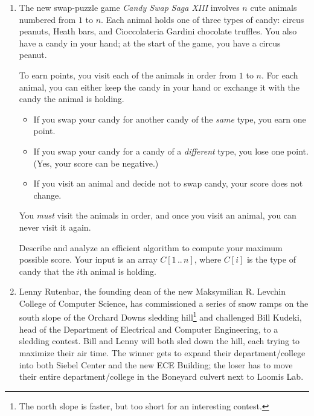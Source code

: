 \begin{enumerate}[label=\arabic*.,ref=\thechapter.\arabic*,leftmargin=*,align=left,widest*=99,itemsep=1.5ex plus 0.5ex]
Describe and analyze an efficient algorithm to compute the maximum total score you can achieve.
The input to your sweet algorithm is the pair of arrays $\Var{Score}[1\,..\,n]$ and $\Var{Wait}[1\,..\,n]$.

\item The new swap-puzzle game \textit{Candy Swap Saga XIII} involves $n$ cute animals numbered from $1$ to $n$.
Each animal holds one of three types of candy: circus peanuts, Heath bars, and Cioccolateria Gardini chocolate truffles.
You also have a candy in your hand; at the start of the game, you have a circus peanut.

To earn points, you visit each of the animals in order from $1$ to $n$.
For each animal, you can either keep the candy in your hand or exchange it with the candy the animal is holding.
\begin{itemize}
\item If you swap your candy for another candy of the \textit{same} type, you earn one point.
\item If you swap your candy for a candy of a \textit{different} type, you lose one point.
(Yes, your score can be negative.)
\item If you visit an animal and decide not to swap candy, your score does not change.
\end{itemize}
You \textit{must} visit the animals in order, and once you visit an animal, you can never visit it again.

Describe and analyze an efficient algorithm to compute your maximum possible score.
Your input is an array $C[1\,..\,n]$, where $C[i]$ is the type of candy that the $i$th animal is holding.

\item Lenny Rutenbar, the founding dean of the new Maksymilian R. Levchin College of Computer Science, has commissioned a series of snow ramps on the south slope of the Orchard Downs sledding hill\footnote{The north slope is faster, but too short for an interesting contest.} and challenged Bill Kudeki, head of the Department of Electrical and Computer Engineering, to a sledding contest.
Bill and Lenny will both sled down the hill, each trying to maximize their air time.
The winner gets to expand their department/college into both Siebel Center and the new ECE Building; the loser has to move their entire department/college in the Boneyard culvert next to Loomis Lab.


\end{enumerate}
